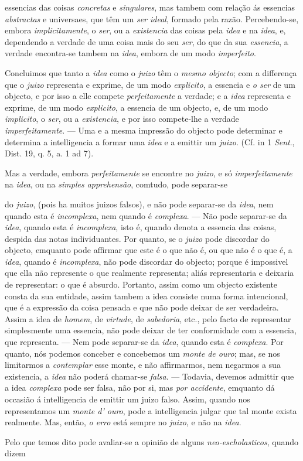 essencias das coisas \emph{concretas} e \emph{singulares}, mas tambem com relação ás essencias \emph{abstractas} e universaes, que têm um \emph{ser ideal}, formado pela razão. Percebendo-se, embora \emph{implicitamente}, o \emph{ser}, ou a \emph{existencia} das coisas pela \emph{idea} e na \emph{idea}, e, dependendo a verdade de uma coisa mais do seu \emph{ser}, do que da sua \emph{essencia}, a verdade encontra-se tambem na \emph{idea}, embora de um modo \emph{imperfeito}.\par Concluimos que tanto a \emph{idea} como o \emph{juizo} têm o \emph{mesmo objecto}; com a differença que o \emph{juizo} representa e exprime, de um modo \emph{explicito}, a essencia e \emph{o ser} de um objecto, e por isso a elle compete \emph{perfeitamente} a verdade; e a \emph{idea} representa e exprime, de um modo \emph{explicito}, a essencia de um objecto, e, de um modo \emph{implicito}, o \emph{ser}, ou a \emph{existencia}, e por isso compete-lhe a verdade \emph{imperfeitamente}. --- Uma e a mesma impressão do objecto pode determinar e determina a intelligencia a formar uma \emph{idea} e a emittir um \emph{juizo}. (Cf. in 1 \emph{Sent}., Dist. 19, q. 5, a. 1 ad 7).\par Mas a verdade, embora \emph{perfeitamente} se encontre no \emph{juizo}, e só \emph{imperfeitamente} na \emph{idea}, ou na \emph{simples apprehensão}, comtudo, pode separar-se\par {}do \emph{juizo}, (pois ha muitos juizos falsos), e não pode separar-se da \emph{idea}, nem quando esta é \emph{incomplexa}, nem quando é \emph{complexa}. --- Não pode separar-se da \emph{idea}, quando esta é \emph{incomplexa}, isto é, quando denota a essencia das coisas, despida das notas individuantes. Por quanto, se o \emph{juizo} pode discordar do objecto, emquanto pode affirmar que este é o que não é, ou que não é o que é, a \emph{idea}, quando é \emph{incomplexa}, não pode discordar do objecto; porque é impossivel que ella não represente o que realmente representa; aliás representaria e deixaria de representar: o que é absurdo. Portanto, assim como um objecto existente consta da sua entidade, assim tambem a idea consiste numa forma intencional, que é a expressão da coisa pensada e que não pode deixar de ser verdadeira. Assim a idea de \emph{homem}, de \emph{virtude}, de \emph{sabedoria}, etc., pelo facto de representar simplesmente uma essencia, não pode deixar de ter conformidade com a essencia, que representa. --- Nem pode separar-se da \emph{idea}, quando esta é \emph{complexa}. Por quanto, nós podemos conceber e concebemos um \emph{monte de ouro}; mas, se nos limitarmos a \emph{contemplar} esse monte, e não affirmarmos, nem negarmos a sua existencia, a \emph{idea} não poderá chamar-se \emph{falsa}. --- Todavia, devemos admittir que a idea \emph{complexa} pode ser falsa, não por si, mas \emph{por accidente}, emquanto dá occasião á intelligencia de emittir um juizo falso. Assim, quando nos representamos um \emph{monte d' ouro}, pode a intelligencia julgar que tal monte exista realmente. Mas, então, \emph{o erro} está sempre no \emph{juizo}, e não na \emph{idea}.\par Pelo que temos dito pode avaliar-se a opinião de alguns \emph{neo-escholasticos}, quando dizem 